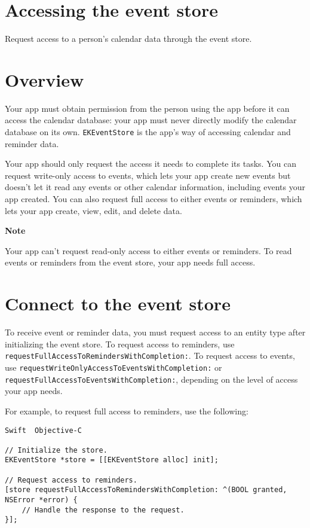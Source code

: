 \documentclass{article}
\title{}
\author{}
\date{}
\begin{document}
\section*{Accessing the event store}
Request access to a person's calendar data through the event store.

\section*{Overview}
Your app must obtain permission from the person using the app before it can access the calendar database: your app must never directly modify the calendar database on its own. \texttt{EKEventStore} is the app's way of accessing calendar and reminder data.

Your app should only request the access it needs to complete its tasks. You can request write-only access to events, which lets your app create new events but doesn't let it read any events or other calendar information, including events your app created. You can also request full access to either events or reminders, which lets your app create, view, edit, and delete data.

\textbf{Note}

Your app can't request read-only access to either events or reminders. To read events or reminders from the event store, your app needs full access.

\section*{Connect to the event store}
To receive event or reminder data, you must request access to an entity type after initializing the event store. To request access to reminders, use \texttt{requestFullAccessToRemindersWithCompletion:}. To request access to events, use \texttt{requestWriteOnlyAccessToEventsWithCompletion:} or \texttt{requestFullAccessToEventsWithCompletion:}, depending on the level of access your app needs.

For example, to request full access to reminders, use the following:

\begin{verbatim}
Swift  Objective-C

// Initialize the store.
EKEventStore *store = [[EKEventStore alloc] init];

// Request access to reminders.
[store requestFullAccessToRemindersWithCompletion: ^(BOOL granted, NSError *error) {
    // Handle the response to the request.
}];
\end{verbatim}
\end{document}
